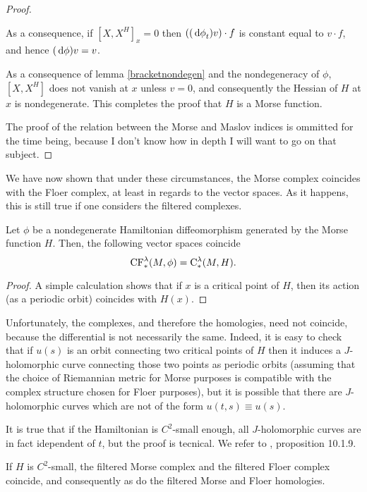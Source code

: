 \begin{proof}
\begin{lemmaproof}
As a consequence, if $[X,X^H]_x = 0$ then $((\dl \phi_t)v) \cdot f$ is constant equal to $v \cdot f$, and hence $(\dl \phi) v = v$.
\end{lemmaproof}

As a consequence of lemma \ref{bracketnondegen} and the nondegeneracy of $\phi$, $[X,X^H]$ does not vanish at $x$ unless $v = 0$, and consequently the Hessian of $H$ at $x$ is nondegenerate. This completes the proof that $H$ is a Morse function.

The proof of the relation between the Morse and Maslov indices is ommitted for the time being, because I don't know how in depth I will want to go on that subject.
\end{proof}

We have now shown that under these circumstances, the Morse complex coincides with the Floer complex, at least in regards to the vector spaces. As it happens, this is still true if one considers the filtered complexes.

\begin{prop}
Let $\phi$ be a nondegenerate Hamiltonian diffeomorphism generated by the Morse function $H$. Then, the following vector spaces coincide
\begin{equation}
\mathrm{CF}^\lambda_*(M,\phi) = \mathrm{C}^\lambda_*(M,H).
\end{equation}
\end{prop}

\begin{proof}
A simple calculation shows that if $x$ is a critical point of $H$, then its action (as a periodic orbit) coincides with $H(x)$.
\end{proof}

Unfortunately, the complexes, and therefore the homologies, need not coincide, because the differential is not necessarily the same. Indeed, it is easy to check that if $u(s)$ is an orbit connecting two critical points of $H$ then it induces a $J$-holomorphic curve connecting those two points as periodic orbits (assuming that the choice of Riemannian metric for Morse purposes is compatible with the complex structure chosen for Floer purposes), but it is possible that there are $J$-holomorphic curves which are not of the form $u(t,s) \equiv u(s)$.

It is true that if the Hamiltonian is $C^2$-small enough, all $J$-holomorphic curves are in fact idependent of $t$, but the proof is tecnical. We refer to \cite{audin}, proposition 10.1.9.

\begin{prop}
If $H$ is $C^2$-small, the filtered Morse complex and the filtered Floer complex coincide, and consequently as do the filtered Morse and Floer homologies.
\end{prop}

